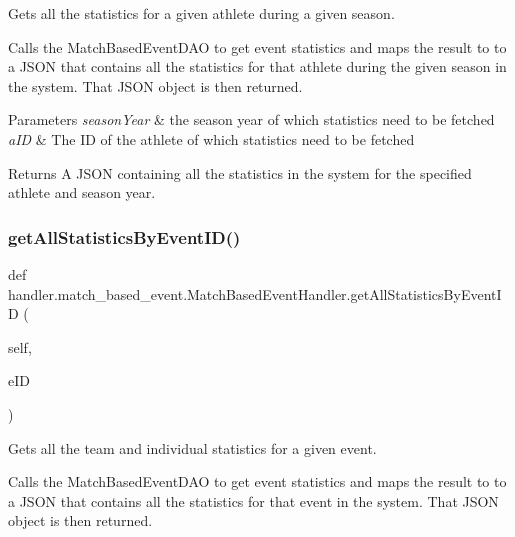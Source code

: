 Gets all the statistics for a given athlete during a given season. 

Calls the Match\+Based\+Event\+D\+AO to get event statistics and maps the result to to a J\+S\+ON that contains all the statistics for that athlete during the given season in the system. That J\+S\+ON object is then returned.


\begin{DoxyParams}{Parameters}
{\em season\+Year} & the season year of which statistics need to be fetched \\
\hline
{\em a\+ID} & The ID of the athlete of which statistics need to be fetched\\
\hline
\end{DoxyParams}
\begin{DoxyReturn}{Returns}
A J\+S\+ON containing all the statistics in the system for the specified athlete and season year. 
\end{DoxyReturn}
\mbox{\label{classhandler_1_1match__based__event_1_1_match_based_event_handler_a3196927bca3c695aa87beec2ced87dfd}} 
\subsubsection{\texorpdfstring{get\+All\+Statistics\+By\+Event\+I\+D()}{getAllStatisticsByEventID()}}
{\footnotesize\ttfamily def handler.\+match\+\_\+based\+\_\+event.\+Match\+Based\+Event\+Handler.\+get\+All\+Statistics\+By\+Event\+ID (\begin{DoxyParamCaption}\item[{}]{self,  }\item[{}]{e\+ID }\end{DoxyParamCaption})}



Gets all the team and individual statistics for a given event. 

Calls the Match\+Based\+Event\+D\+AO to get event statistics and maps the result to to a J\+S\+ON that contains all the statistics for that event in the system. That J\+S\+ON object is then returned.



